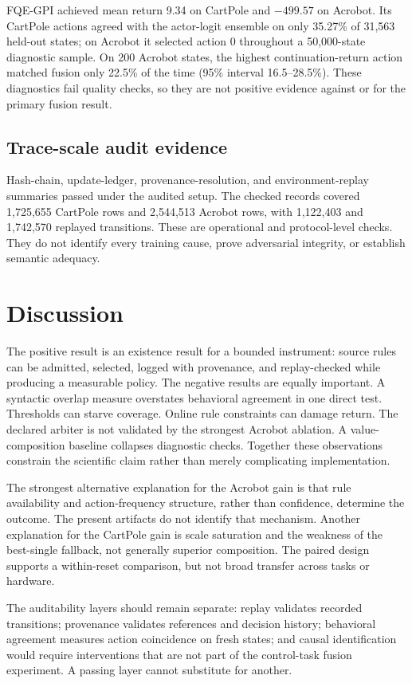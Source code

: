 \documentclass[11pt,a4paper]{article}
\begin{document}
FQE-GPI achieved mean return 9.34 on CartPole and $-499.57$ on Acrobot. Its CartPole actions agreed with the actor-logit ensemble on only 35.27\% of 31,563 held-out states; on Acrobot it selected action 0 throughout a 50,000-state diagnostic sample. On 200 Acrobot states, the highest continuation-return action matched fusion only 22.5\% of the time (95\% interval 16.5--28.5\%). These diagnostics fail quality checks, so they are not positive evidence against or for the primary fusion result.

\subsection{Trace-scale audit evidence}
Hash-chain, update-ledger, provenance-resolution, and environment-replay summaries passed under the audited setup. The checked records covered 1,725,655 CartPole rows and 2,544,513 Acrobot rows, with 1,122,403 and 1,742,570 replayed transitions. These are operational and protocol-level checks. They do not identify every training cause, prove adversarial integrity, or establish semantic adequacy.

\section{Discussion}
\label{sec:discussion}
The positive result is an existence result for a bounded instrument: source rules can be admitted, selected, logged with provenance, and replay-checked while producing a measurable policy. The negative results are equally important. A syntactic overlap measure overstates behavioral agreement in one direct test. Thresholds can starve coverage. Online rule constraints can damage return. The declared arbiter is not validated by the strongest Acrobot ablation. A value-composition baseline collapses diagnostic checks. Together these observations constrain the scientific claim rather than merely complicating implementation.

The strongest alternative explanation for the Acrobot gain is that rule availability and action-frequency structure, rather than confidence, determine the outcome. The present artifacts do not identify that mechanism. Another explanation for the CartPole gain is scale saturation and the weakness of the best-single fallback, not generally superior composition. The paired design supports a within-reset comparison, but not broad transfer across tasks or hardware.

The auditability layers should remain separate: replay validates recorded transitions; provenance validates references and decision history; behavioral agreement measures action coincidence on fresh states; and causal identification would require interventions that are not part of the control-task fusion experiment. A passing layer cannot substitute for another.
\end{document}
